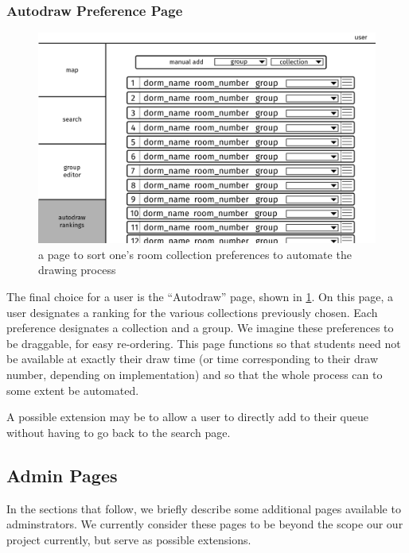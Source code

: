\subsubsection{Autodraw Preference Page}
\begin{figure} \centering
\includegraphics[scale=.15]{wireframe/autodraw}
\caption{a page to sort one's room collection preferences to automate the
    drawing process}
\label{fig:wireprefs}
\end{figure}

The final choice for a user is the ``Autodraw'' page, shown in
\cref{fig:wireprefs}. On this page, a user designates a ranking for the various
collections previously chosen. Each preference designates a collection and a
group. We imagine these preferences to be draggable, for easy re-ordering. This
page functions so that students need not be available at exactly their draw time
(or time corresponding to their draw number, depending on implementation) and so
that the whole process can to some extent be automated.

A possible extension may be to allow a user to directly add to their queue
without having to go back to the search page.

\subsection{Admin Pages}

In the sections that follow, we briefly describe some additional pages available
to adminstrators. We currently consider these pages to be beyond the scope our
our project currently, but serve as possible extensions.

